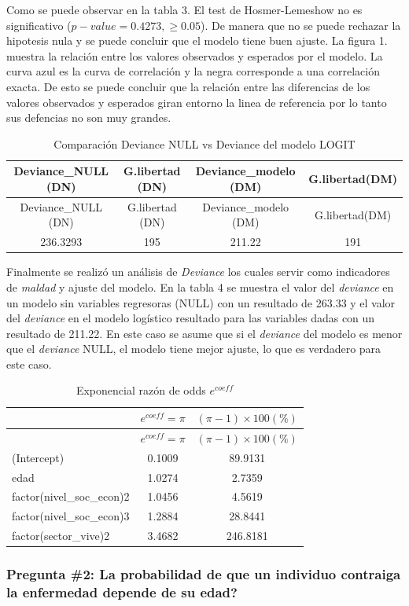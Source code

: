 \documentclass[
]{article}
\begin{document}
Como se puede observar en la tabla 3. El test de Hosmer-Lemeshow no es
significativo (\(p - value = 0.4273, \geq 0.05\)). De manera que no se
puede rechazar la hipotesis nula y se puede concluir que el modelo tiene
buen ajuste. La figura 1. muestra la relación entre los valores
observados y esperados por el modelo. La curva azul es la curva de
correlación y la negra corresponde a una correlación exacta. De esto se
puede concluir que la relación entre las diferencias de los valores
observados y esperados giran entorno la linea de referencia por lo tanto
sus defencias no son muy grandes.

\begin{longtable}[]{@{}cccc@{}}
\caption{Comparación Deviance NULL vs Deviance del modelo
LOGIT}\tabularnewline
\toprule
Deviance\_NULL (DN) & G.libertad (DN) & Deviance\_modelo (DM) &
G.libertad(DM)\tabularnewline
\midrule
\endfirsthead
\toprule
Deviance\_NULL (DN) & G.libertad (DN) & Deviance\_modelo (DM) &
G.libertad(DM)\tabularnewline
\midrule
\endhead
236.3293 & 195 & 211.22 & 191\tabularnewline
\bottomrule
\end{longtable}

Finalmente se realizó un análisis de \emph{Deviance} los cuales servir
como indicadores de \emph{maldad} y ajuste del modelo. En la tabla 4 se
muestra el valor del \emph{deviance} en un modelo sin variables
regresoras (NULL) con un resultado de 263.33 y el valor del
\emph{deviance} en el modelo logístico resultado para las variables
dadas con un resultado de 211.22. En este caso se asume que si el
\emph{deviance} del modelo es menor que el \emph{deviance} NULL, el
modelo tiene mejor ajuste, lo que es verdadero para este caso.

\begin{longtable}[]{@{}lcc@{}}
\caption{Exponencial razón de odds \(e^{coeff}\)}\tabularnewline
\toprule
& \(e^{coeff} = \pi\) & \((\pi-1)\times100 (\%)\)\tabularnewline
\midrule
\endfirsthead
\toprule
& \(e^{coeff} = \pi\) & \((\pi-1)\times100 (\%)\)\tabularnewline
\midrule
\endhead
(Intercept) & 0.1009 & 89.9131\tabularnewline
edad & 1.0274 & 2.7359\tabularnewline
factor(nivel\_soc\_econ)2 & 1.0456 & 4.5619\tabularnewline
factor(nivel\_soc\_econ)3 & 1.2884 & 28.8441\tabularnewline
factor(sector\_vive)2 & 3.4682 & 246.8181\tabularnewline
\bottomrule
\end{longtable}

\hypertarget{pregunta-2-la-probabilidad-de-que-un-individuo-contraiga-la-enfermedad-depende-de-su-edad}{%
\subsubsection{Pregunta \#2: La probabilidad de que un individuo
contraiga la enfermedad depende de su
edad?}\label{pregunta-2-la-probabilidad-de-que-un-individuo-contraiga-la-enfermedad-depende-de-su-edad}}
\end{document}
